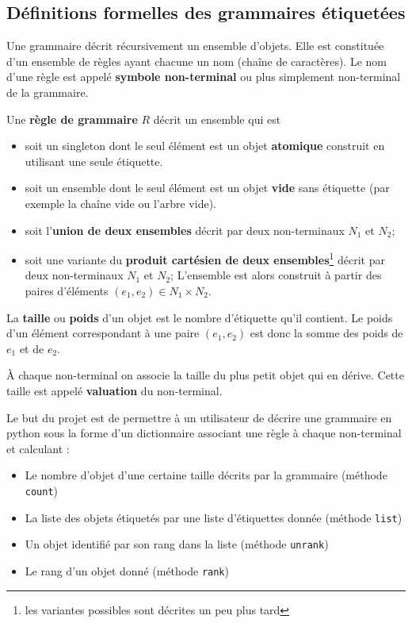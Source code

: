 \documentclass[11pt]{article}
\renewcommand{\emph}[1]{\textbf{#1}}
\newcommand{\cnt}{\texttt{count}\xspace}
\newcommand{\lst}{\texttt{list}\xspace}
\newcommand{\unrank}{\texttt{unrank}\xspace}
\newcommand{\rank}{\texttt{rank}\xspace}
\begin{document}
\subsection{Définitions formelles des grammaires étiquetées}

Une grammaire décrit récursivement un ensemble d'objets. Elle est constituée
d'un ensemble de règles ayant chacune un nom (chaîne de caractères). Le nom
d'une règle est appelé \emph{symbole non-terminal} ou plus simplement
non-terminal de la grammaire.  \medskip

Une \emph{règle de grammaire} $R$ décrit un ensemble qui est
\begin{itemize}
\item soit un singleton dont le seul élément est un objet
  \emph{atomique} construit en utilisant une seule étiquette.
\item soit un ensemble dont le seul élément est un objet
  \emph{vide} sans étiquette (par exemple la chaîne vide ou l'arbre vide).
\item soit l'\emph{union de deux ensembles} décrit par deux
  non-terminaux $N_1$ et $N_2$;
\item soit une variante du \emph{produit
    cartésien de deux ensembles}\footnote{les variantes possibles sont décrites un peu plus tard}
    décrit par deux non-terminaux $N_1$ et $N_2$;
  L'ensemble est alors construit à partir des paires d'éléments $(e_1, e_2)
  \in N_1 \times N_2$.
\end{itemize}
\medskip

La \emph{taille} ou \emph{poids} d'un objet est le nombre d'étiquette qu'il
contient. Le poids d'un élément correspondant à une paire $(e_1, e_2)$ est
donc la somme des poids de $e_1$ et de $e_2$.

À chaque non-terminal on associe la taille du plus petit objet qui en dérive.
Cette taille est appelé \emph{valuation} du non-terminal.

Le but du projet est de permettre à un utilisateur de décrire une grammaire
en python sous la forme d'un dictionnaire associant une règle à chaque
non-terminal et calculant :
\begin{itemize}
\item Le nombre d'objet d'une certaine taille décrits par la grammaire
  (méthode \cnt)
\item La liste des objets étiquetés par une liste d'étiquettes donnée (méthode
  \lst)
\item Un objet identifié par son rang dans la liste (méthode \unrank)
\item Le rang d'un objet donné (méthode \rank)
\end{itemize}
\end{document}
